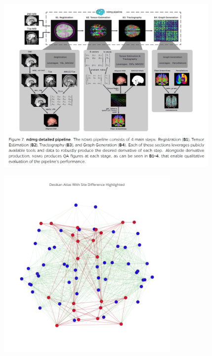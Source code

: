 \documentclass[mathserif,t]{beamer}
\newcommand{\Mgc}{MGC}
\begin{document}

\begin{frame}
\begin{figure}[!ht]
	\centering
	\includegraphics[width=4.3in]{brain0.jpg}
	\label{fig:study}
\end{figure}
\end{frame}

\begin{frame}
\begin{figure}[!ht]
	\centering
	\includegraphics[width=3.5in]{brain.png}
	\label{fig:study}
\end{figure}
\end{frame}
\end{document}
